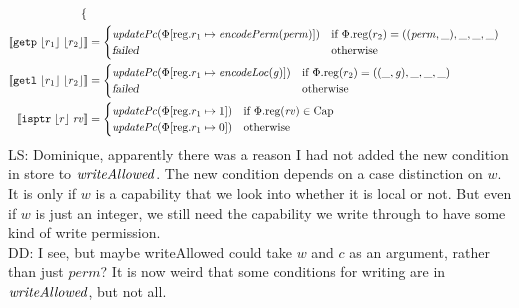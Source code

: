 \documentclass[a4paper]{article}
\newcommand{\update}[2]{[#1 \mapsto #2]}
\newcommand{\sem}[1]{\left\llbracket #1 \right\rrbracket}
\newcommand\lau[1]{{\color{purple} \sf \footnotesize {LS: #1}}\\}
\newcommand\dominique[1]{{\color{purple} \sf \footnotesize {DD: #1}}\\}
\newcommand{\var}[1]{\mathit{#1}}
\newcommand{\rv}{\var{rv}}
\newcommand{\gl}{\var{g}}
\newcommand{\perm}{\var{perm}}
\newcommand{\plainproj}[1]{\mathrm{#1}}
\newcommand{\memreg}[1][\Phi]{#1.\plainproj{reg}}
\newcommand{\updateReg}[3][\Phi]{#1\update{\plainproj{reg}.#2}{#3}}
\newcommand{\failed}{\textsl{failed}}
\newcommand{\plainfun}[2]{
  \ifthenelse{\equal{#2}{}}
  {\mathit{#1}}
  {\mathit{#1}(#2)}
}
\newcommand{\encodePerm}{\mathit{encodePerm}}
\newcommand{\encodeLoc}{\mathit{encodeLoc}{}}
\newcommand{\writeAllowed}[1]{\plainfun{writeAllowed}{#1}}
\newcommand{\stdUpdatePc}[1]{\plainfun{updatePc}{#1}}
\newcommand{\plaindom}[1]{\mathrm{#1}}
\newcommand{\Caps}{\plaindom{Cap}}
\newcommand{\refreg}[1]{\lfloor #1 \rfloor}
\newcommand{\zinstr}[1]{\mathtt{#1}}
\newcommand{\twoinstr}[3]{\zinstr{#1} \; #2 \; #3}
\newcommand{\isptr}[2]{\twoinstr{isptr}{#1}{#2}}
\newcommand{\getp}[2]{\twoinstr{getp}{#1}{#2}}
\newcommand{\getl}[2]{\twoinstr{getl}{#1}{#2}}
\begin{document}
\begin{align*}
\begin{cases}
                                            \end{cases}
  \\
  \sem{\getp{\refreg{r_1}}{\refreg{r_2}}} & = 
                                            \begin{cases}
                                              \stdUpdatePc{\updateReg{r_1}{\encodePerm(\perm)}} &
                                              \arraycolsep=0pt
                                              \begin{array}[t]{l}
                                                \text{if $\memreg(r_2) = ((\perm,\_),\_,\_,\_)$}
                                              \end{array} \\
                                              \failed & \text{otherwise}
                                            \end{cases}
  \\
  \sem{\getl{\refreg{r_1}}{\refreg{r_2}}} & = 
                                            \begin{cases}
                                              \stdUpdatePc{\updateReg{r_1}{\encodeLoc(\gl)}} &
                                              \arraycolsep=0pt
                                              \begin{array}[t]{l}
                                                \text{if $\memreg(r_2) = ((\_,\gl),\_,\_,\_)$}
                                              \end{array} \\
                                              \failed & \text{otherwise}
                                            \end{cases}
  \\
  \sem{\isptr{\refreg{r}}{\rv}} & =  
                                  \begin{cases}
                                    \stdUpdatePc{\updateReg{r_1}{1}} & \text{if $\memreg(\rv) \in \Caps$ } \\
                                    \stdUpdatePc{\updateReg{r_1}{0}} & \text{otherwise} 
                                  \end{cases}
\end{align*}
\lau{Dominique, apparently there was a reason I had not added the new condition in store to $\writeAllowed{}$. The new condition depends on a case distinction on $w$. It is only if $w$ is a capability that we look into whether it is local or not. But even if $w$ is just an integer, we still need the capability we write through to have some kind of write permission.}
\dominique{I see, but maybe writeAllowed could take $w$ and $c$ as an argument, rather than just $\perm$? It is now weird that some conditions for writing are in $\writeAllowed{}$, but not all.}
\end{document}

